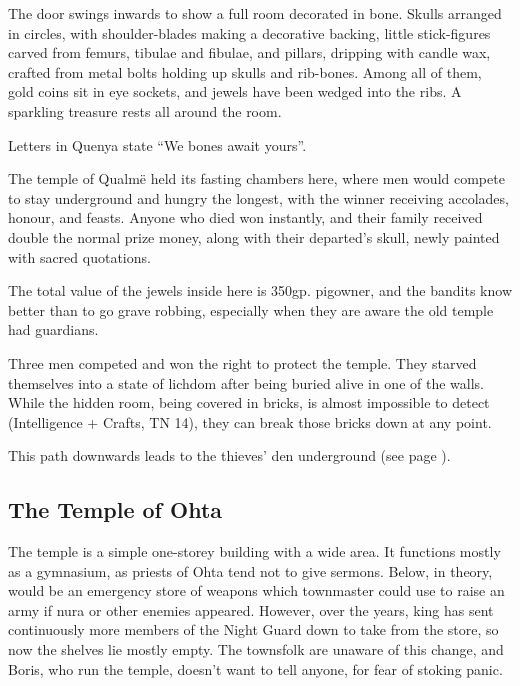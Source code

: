 \begin{multicols}{2}
\begin{boxtext}
	The door swings inwards to show a full room decorated in bone.
	Skulls arranged in circles, with shoulder-blades making a decorative backing, little stick-figures carved from femurs, tibulae and fibulae, and pillars, dripping with candle wax, crafted from metal bolts holding up skulls and rib-bones.
	Among all of them, gold coins sit in eye sockets, and jewels have been wedged into the ribs.
	A sparkling treasure rests all around the room.

	Letters in Quenya state ``We bones await yours''.
\end{boxtext}

The temple of Qualm\"{e} held its fasting chambers here, where men would compete to stay underground and hungry the longest, with the winner receiving accolades, honour, and feasts.  Anyone who died won instantly, and their family received double the normal prize money, along with their departed's skull, newly painted with sacred quotations.

The total value of the jewels inside here is 350gp.
\Gls{pigowner}, and the bandits know better than to go grave robbing, especially when they are aware the old temple had guardians.


Three men competed and won the right to protect the temple.
They starved themselves into a state of lichdom after being buried alive in one of the walls.
While the hidden room, being covered in bricks, is almost impossible to detect (Intelligence + Crafts, TN 14), they can break those bricks down at any point.

\demilich

This path downwards leads to the thieves' den underground (see page \pageref{pigexit}).

\end{multicols}

\subsection{The Temple of Ohta}

The temple is a simple one-storey building with a wide area.
It functions mostly as a gymnasium, as priests of Ohta tend not to give sermons.
Below, in theory, would be an emergency store of weapons which \gls{townmaster} could use to raise an army if nura or other enemies appeared.
However, over the years, \gls{king} has sent continuously more members of the Night Guard down to take from the store, so now the shelves lie mostly empty.
The townsfolk are unaware of this change, and Boris, who run the temple, doesn't want to tell anyone, for fear of stoking panic.

